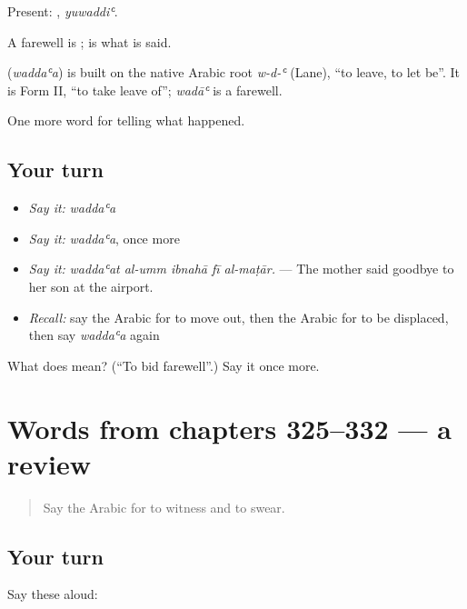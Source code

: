 Present: , \emph{yuwaddiʿ}.

A farewell is ;   is what is said.

\begin{cousinweb}
\textbf{} (\emph{waddaʿa}) is built on the native Arabic root \emph{w-d-ʿ} (Lane), \textquotedblleft{}to leave, to let be\textquotedblright{}. It is Form II, \textquotedblleft{}to take leave of\textquotedblright{}; \emph{wadāʿ} is a farewell.
\end{cousinweb}

\begin{grammarlens}[title={What you've built}]
One more word for telling what happened.
\end{grammarlens}

\subsection*{Your turn}
\begin{itemize}
\raggedright
  \item \emph{Say it:} \emph{waddaʿa}
  \item \emph{Say it:} \emph{waddaʿa}, once more
  \item \emph{Say it:} \emph{waddaʿat al-umm ibnahā fī al-maṭār.} — The mother said goodbye to her son at the airport.
  \item \emph{Recall:} say the Arabic for to move out, then the Arabic for to be displaced, then say \emph{waddaʿa} again
\end{itemize}

\begin{tcolorbox}[breakable,colback=teal!4,colframe=teal!35!black,title={Before you move on}]
What does  mean? (\textquotedblleft{}To bid farewell\textquotedblright{}.) Say it once more.
\end{tcolorbox}
\section[(dialogue)]{Words from chapters 325–332 — a review}

\label{lesson:AR-R332-review-325-332}



\begin{quote}
Say the Arabic for to witness and to swear.
\end{quote}

\subsection*{Your turn}
Say these aloud:

